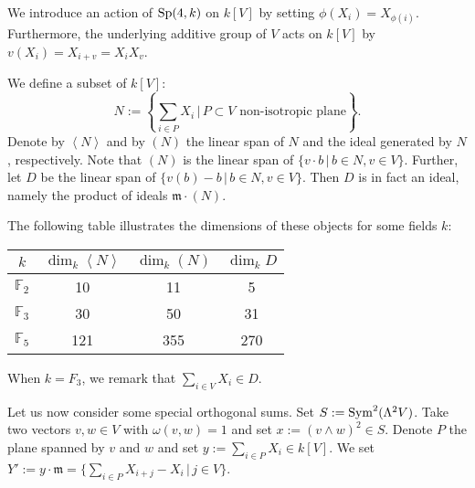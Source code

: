 We introduce an action of $\operatorname{Sp} (4,k)$ on $k[V]$ by setting $\phi(X_i) = X_{\phi(i)}$. Furthermore, the underlying additive group of $V$ acts on $k[V]$ by $v( X_i) = X_{i+v} =X_iX_v$. 
\begin{definition} \label{SymplecticIdeal}
We define a subset of $k[V]$:
$$
N  := \left\{\sum_{i\in P}X_i \,|\, P\subset V \text{ non-isotropic plane}\right\}.
$$
Denote by $\left< N \right>$ and by $(N)$ the linear span of $N$ and the ideal generated by $N$, respectively. Note that $(N) $ is the linear span of $ \{ v\cdot b \,|\, b\in N, v\in V \}$.
Further, let $D$ be the linear span of $\{v(b) - b \,|\, b\in N, v\in V \}$. Then $D$ is in fact an ideal, namely the product of ideals $\mathfrak m\cdot (N)$.
\end{definition}
The following table illustrates the dimensions of these objects for some fields $k$:
\vspace{2mm}
\begin{center}
\begin{tabular}{c||c|c|c}
 $k$ & $\dim_k \left<N\right>$ & $\dim_k(N)$ & $\dim_k D$ \\
\hline
$\mathbb F_2$ & 10 & 11 &  5  \\
$\mathbb F_3$ & 30 & 50 & 31  \\
$\mathbb F_5$ &121 &355 &270
\end{tabular}
\end{center}
\begin{rmk}\label{c2}
When $k=F_3$, we remark that $\sum_{i\in V}X_i\in D$.
\end{rmk}
Let us now consider some special orthogonal sums.
Set $S:=\operatorname{Sym}^2 (\Lambda^2V)$. Take two vectors $v,w\in V$ with $\omega(v,w)=1$ and set $x:= (v\wedge w)^2\in S$. Denote $P$ the plane spanned by $v$ and $w$ and set $y:= \sum_{i\in P}X_i\in  k[V]$.
We set $Y':=y\cdot \mathfrak{m} = \{\sum_{i\in P} X_{i+j}-X_i\,|\, j\in V \} $.

